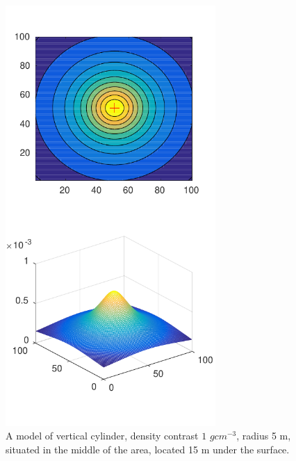 \documentclass{article}
\begin{document}
\begin{figure}[!htp]
\centerline{\includegraphics[width=8cm]{img/Vertical_cylinder_50_50_15_1000000_5_100_1_100_1.pdf}}
\renewcommand{\figurename}{Figure}
\caption[Input data example - Vertical cylinder]{A model of vertical cylinder, density contrast $1$ $gcm^{-3}$, radius 5 m, situated in the middle of the area, located 15 m under the surface.}
\label{fig:VerticalAnomalyExample}
\end{figure}
\end{document}
